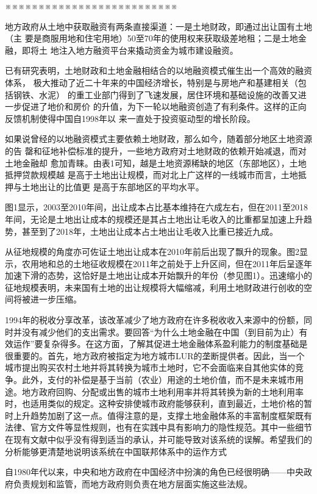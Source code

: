 ※※※※※※※※※※※※※※※※※※※※※※※※※※

地方政府从土地中获取融资有两条直接渠道：一是土地财政，即通过出让国有土地（主
要是商服用地和住宅用地）50至70年的使用权来获取级差地租；二是土地金融，即将土
地注入地方融资平台来撬动资金为城市建设融资。

已有研究表明，土地财政和土地金融相结合的以地融资模式催生出一个高效的融资体系，
极大推动了近二十年来的中国经济增长，特别是与房地产和基建相关（包括钢铁、水泥）
的重工业部门得到了飞速发展，居住环境和基础设施的改善又进一步促进了地价和房价
的升值，为下一轮以地融资创造了有利条件。这样的正向反馈机制使得中国自1998年以
来一直处于投资驱动型的增长阶段。

如果说曾经的以地融资模式主要依赖土地财政，那么如今，随着部分地区土地资源的告
罄和征地补偿标准的提升，一些地方政府对土地财政的依赖开始减退，而对土地金融却
愈加青睐。由表1可知，越是土地资源稀缺的地区（东部地区），土地抵押贷款规模越
是高于土地出让规模，而对北上广这样的一线城市而言，土地抵押与土地出让的比值更
是高于东部地区的平均水平。

图1显示，2003至2010年间，出让成本占比基本维持在六成左右，但在2011至2018年间，无论是土地出让成本的规模还是其占土地出让毛收入的比重都呈加速上升趋势，甚至到了2018年，土地出让成本占土地出让毛收入比重已接近九成。

从征地规模的角度亦可佐证土地出让成本在2010年前后出现了飘升的现象。图2显示，农用地和总的土地征收规模在2011年之前处于上升区间，但在2011年后呈逐年加速下滑的态势，这恰好是土地出让成本开始飘升的年份（参见图1）。迅速缩小的征地规模表明，未来国有土地的出让规模将大幅缩减，利用土地财政进行创收的空间将被进一步压缩。

1994年的税收分享改革，该改革减少了地方政府在许多税收收入来源中的份额，同时并没有减少他们的支出需求。要回答“为什么土地金融在中国（到目前为止）有效运作”要复杂得多。在这方面，了解其促进土地金融体系盈利能力的制度基础是很重要的。首先，地方政府被指定为地方城市LUR的垄断提供者。因此，当一个城市提出购买农村土地并将其转换为城市土地时，它不会面临来自其他实体的竞争。此外，支付的补偿是基于当前（农业）用途的土地价值，而不是未来城市用途。地方政府回购、分配或出售的城市土地利用率并将其转换为新的土地利用率时，也适用类似的规定。这种安排使城市政府能够获利，直到最近，土地价格的暂时上升趋势加剧了这一点。值得注意的是，支撑土地金融体系的丰富制度框架既有法律、官方文件等显性规则，也有在实践中具有影响力的隐性规范。其中一些细节在现有文献中似乎没有得到适当的承认，并可能导致对该系统的误解。希望我们的分析能够更清楚地说明该系统在中国联邦体系中的运作方式

自1980年代以来，中央和地方政府在中国经济中扮演的角色已经很明确——中央政府负责规划和监管，而地方政府则负责在地方层面实施这些法规。

